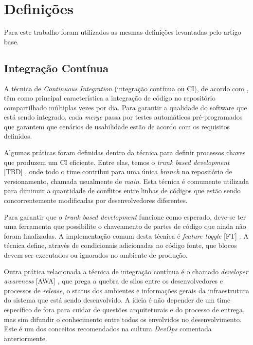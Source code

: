 \section{Definições}

Para este trabalho foram utilizados as mesmas definições levantadas pelo artigo base.

\subsection{Integração Contínua}
A técnica de \emph{Continuous Integration} (integração contínua ou CI), de acordo com \cite{fowlerCI}, têm como principal característica a integração de código no repositório compartilhado múltiplas vezes por dia. Para garantir a qualidade do software que está sendo integrado, cada \emph{merge} passa por testes automáticos pré-programados que garantem que cenários de usabilidade estão de acordo com os requisitos definidos. 

Algumas práticas foram definidas dentro da técnica para definir processos chaves que produzem um CI eficiente. Entre elas, temos o \emph{trunk based development} [TBD] \cite{devAndDeploymentFB}, onde todo o time contribui para uma única \emph{branch} no repositório de versionamento, chamada usualmente de \emph{main}. Esta técnica é comumente utilizada para diminuir a quantidade de conflitos entre linhas de códigos que estão sendo concorrentemente modificadas por desenvolvedores diferentes. 

Para garantir que o \emph{trunk based development} funcione como esperado, deve-se ter uma ferramenta que possibilite o chaveamento de partes de código que ainda não foram finalizadas. A implementação comum desta técnica é \emph{feature toggle} [FT] \cite{featureToggles}. A técnica define, através de condicionais adicionadas no código fonte, que blocos devem ser executados ou ignorados no ambiente de produção.

Outra prática relacionada a técnica de integração contínua é o chamado \emph{developer awareness} [AWA] \cite{awa}, que prega a quebra de silos entre os desenvolvedores e processos de \emph{release}, o status dos ambientes e informações gerais da infraestrutura do sistema que está sendo desenvolvido. A ideia é não depender de um time específico de fora para cuidar de questões arquiteturais e do processo de entrega, mas sim difundir o conhecimento entre todos os envolvidos no desenvolvimento. Este é um dos conceitos recomendados na cultura \emph{DevOps} comentada anteriormente.

